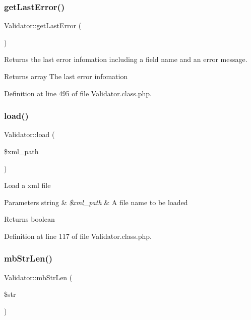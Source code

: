 \subsubsection{\texorpdfstring{get\+Last\+Error()}{getLastError()}}
{\footnotesize\ttfamily Validator\+::get\+Last\+Error (\begin{DoxyParamCaption}{ }\end{DoxyParamCaption})}

Returns the last error infomation including a field name and an error message. \begin{DoxyReturn}{Returns}
array The last error infomation 
\end{DoxyReturn}


Definition at line 495 of file Validator.\+class.\+php.

\mbox{\label{classValidator_a43de0eb69cae01eee855f825324ffc39}} 
\subsubsection{\texorpdfstring{load()}{load()}}
{\footnotesize\ttfamily Validator\+::load (\begin{DoxyParamCaption}\item[{}]{\$xml\+\_\+path }\end{DoxyParamCaption})}

Load a xml file 
\begin{DoxyParams}[1]{Parameters}
string & {\em \$xml\+\_\+path} & A file name to be loaded \\
\hline
\end{DoxyParams}
\begin{DoxyReturn}{Returns}
boolean 
\end{DoxyReturn}


Definition at line 117 of file Validator.\+class.\+php.

\mbox{\label{classValidator_a46de77869676b1b027a076c2106653e2}} 
\subsubsection{\texorpdfstring{mb\+Str\+Len()}{mbStrLen()}}
{\footnotesize\ttfamily Validator\+::mb\+Str\+Len (\begin{DoxyParamCaption}\item[{}]{\$str }\end{DoxyParamCaption})}

